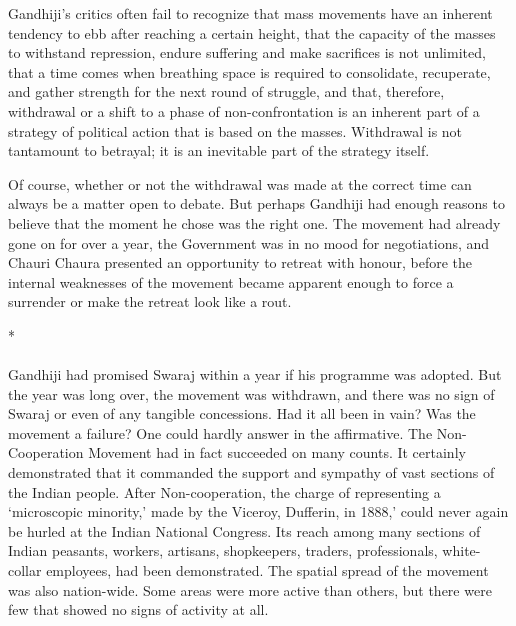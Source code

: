 Gandhiji's critics often fail to recognize that mass movements have an inherent tendency to ebb after reaching a certain height, that the capacity of the masses to withstand repression, endure suffering and make sacrifices is not unlimited, that a time comes when breathing space is required to consolidate, recuperate, and gather strength for the next round of struggle, and that, therefore, withdrawal or a shift to a phase of non-confrontation is an inherent part of a strategy of political action that is based on the masses. Withdrawal is not tantamount to betrayal; it is an inevitable part of the strategy itself. 

Of course, whether or not the withdrawal was made at the correct time can always be a matter open to debate. But perhaps Gandhiji had enough reasons to believe that the moment he chose was the right one. The movement had already gone on for over a year, the Government was in no mood for negotiations, and Chauri Chaura presented an opportunity to retreat with honour, before the internal weaknesses of the movement became apparent enough to force a surrender or make the retreat look like a rout.

\begin{center}*\end{center}

\paragraph*{}


Gandhiji had promised Swaraj within a year if his programme was adopted. But the year was long over, the movement was withdrawn, and there was no sign of Swaraj or even of any tangible concessions. Had it all been in vain? Was the movement a failure? One could hardly answer in the affirmative. The Non- Cooperation Movement had in fact succeeded on many counts. It certainly demonstrated that it commanded the support and sympathy of vast sections of the Indian people. After Non-cooperation, the charge of representing a `microscopic minority,' made by the Viceroy, Dufferin, in 1888,' could never again be hurled at the Indian National Congress. Its reach among many sections of Indian peasants, workers, artisans, shopkeepers, traders, professionals, white-collar employees, had been demonstrated. The spatial spread of the movement was also nation-wide. Some areas were more active than others, but there were few that showed no signs of activity at all. 

